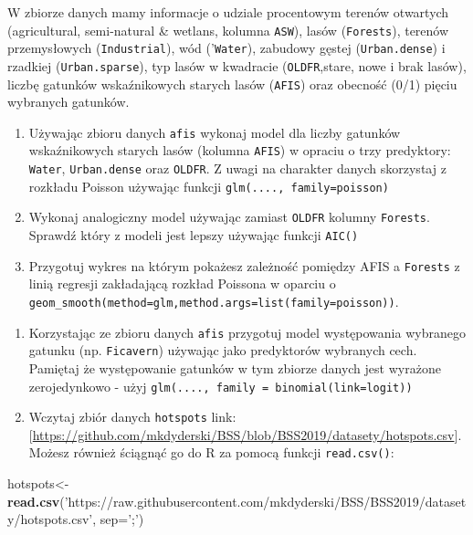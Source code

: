 \documentclass[]{article}
\newenvironment{Shaded}{\begin{snugshade}}{\end{snugshade}}
\newcommand{\KeywordTok}[1]{\textcolor[rgb]{0.13,0.29,0.53}{\textbf{#1}}}
\newcommand{\DataTypeTok}[1]{\textcolor[rgb]{0.13,0.29,0.53}{#1}}
\newcommand{\StringTok}[1]{\textcolor[rgb]{0.31,0.60,0.02}{#1}}
\newcommand{\NormalTok}[1]{#1}
\providecommand{\tightlist}{%
  \setlength{\itemsep}{0pt}\setlength{\parskip}{0pt}}
\begin{document}
W zbiorze danych mamy informacje o udziale procentowym terenów otwartych
(agricultural, semi-natural \& wetlans, kolumna \texttt{ASW}), lasów
(\texttt{Forests}), terenów przemysłowych (\texttt{Industrial}), wód
('\texttt{Water}), zabudowy gęstej (\texttt{Urban.dense}) i rzadkiej
(\texttt{Urban.sparse}), typ lasów w kwadracie (\texttt{OLDFR},stare,
nowe i brak lasów), liczbę gatunków wskaźnikowych starych lasów
(\texttt{AFIS}) oraz obecność (0/1) pięciu wybranych gatunków.

\begin{enumerate}
\def\labelenumi{\alph{enumi}.}
\item
  Używając zbioru danych \texttt{afis} wykonaj model dla liczby gatunków
  wskaźnikowych starych lasów (kolumna \texttt{AFIS}) w opraciu o trzy
  predyktory: \texttt{Water}, \texttt{Urban.dense} oraz \texttt{OLDFR}.
  Z uwagi na charakter danych skorzystaj z rozkładu Poisson używając
  funkcji \texttt{glm(....,\ family=poisson)}
\item
  Wykonaj analogiczny model używając zamiast \texttt{OLDFR} kolumny
  \texttt{Forests}. Sprawdź który z modeli jest lepszy używając funkcji
  \texttt{AIC()}
\item
  Przygotuj wykres na którym pokażesz zależność pomiędzy AFIS a
  \texttt{Forests} z linią regresji zakładającą rozkład Poissona w
  oparciu o
  \texttt{geom\_smooth(method=\textquotesingle{}glm\textquotesingle{},method.args=list(family=\textquotesingle{}poisson\textquotesingle{}))}.
\end{enumerate}

\begin{enumerate}
\def\labelenumi{\arabic{enumi}.}
\setcounter{enumi}{2}
\tightlist
\item
  Korzystając ze zbioru danych \texttt{afis} przygotuj model
  występowania wybranego gatunku (np. \texttt{Ficavern}) używając jako
  predyktorów wybranych cech. Pamiętaj że występowanie gatunków w tym
  zbiorze danych jest wyrażone zerojedynkowo - użyj
  \texttt{glm(....,\ family\ =\ binomial(link=\textquotesingle{}logit\textquotesingle{}))}
\item
  Wczytaj zbiór danych \texttt{hotspots} link:
  {[}\url{https://github.com/mkdyderski/BSS/blob/BSS2019/datasety/hotspots.csv}{]}.
  Możesz również ściągnąć go do R za pomocą funkcji \texttt{read.csv()}:
\end{enumerate}

\begin{Shaded}
\begin{Highlighting}[]
\NormalTok{hotspots<-}\KeywordTok{read.csv}\NormalTok{(}\StringTok{'https://raw.githubusercontent.com/mkdyderski/BSS/BSS2019/datasety/hotspots.csv'}\NormalTok{,}
                   \DataTypeTok{sep=}\StringTok{';'}\NormalTok{)}
\end{Highlighting}
\end{Shaded}
\end{document}
